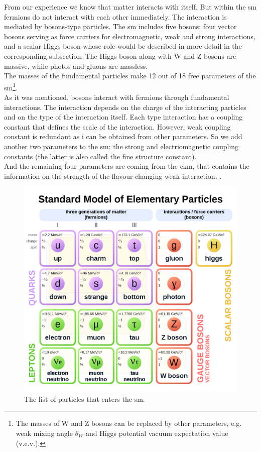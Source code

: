 	From our experience we know that matter interacts with itself. But within the \gls{sm} fermions do not interact with each other immediately. The interaction is mediated by bosons-type particles. The \gls{sm} includes five bosons: four vector bosons serving as force carriers for electromagnetic, weak and strong interactions, and a scalar Higgs boson whose role would be described in more detail in the corresponding subsection. The Higgs boson along with W and Z bosons are massive, while photos and gluons are massless.\\
	The masses of the fundamental particles make 12 out of 18 free parameters of the \gls{sm}\footnote{The masses of W and Z bosons can be replaced by other parameters, e.g. weak mixing angle $\theta_W$ and Higgs potential vacuum expectation value (v.e.v.).}. \\
	As it was mentioned, bosons interact with fermions through fundamental interactions. The interaction depends on the charge of the interacting particles and on the type of the interaction itself. Each type interaction has a coupling constant that defines the scale of the interaction. However, weak coupling constant is redundant as i can be obtained from other parameters. So we add another two parameters to the \gls{sm}: the strong and electriomagnetic coupling constants (the latter is also called the fine structure constant).\\
	And the remaining four parameters are coming from the \gls{ckm}, that contains the information on the strength of the flavour-changing weak interaction. \cite{PhysRevD.86.010001}. 
	
	 \begin{figure}[htpb]
		\includegraphics[width=\textwidth,keepaspectratio]{SMwiki.png}
		\caption{The list of particles that enters the \gls{sm}\cite{sm_wiki}. }
		\label{fig::SMwiki}
	\end{figure}
		
